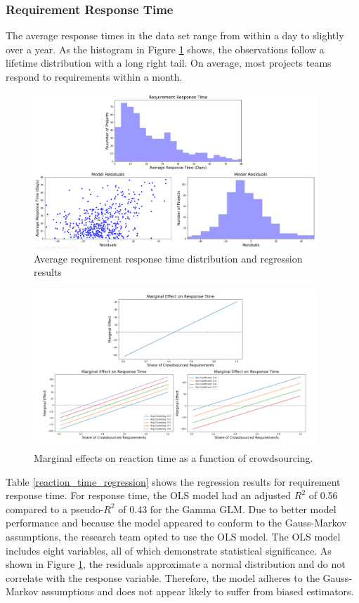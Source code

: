 \subsubsection{Requirement Response Time}

The average response times in the data set range from within a day to slightly over a year. As the histogram in Figure \ref{reaction_time_results} shows, the observations follow a lifetime distribution with a long right tail. On average, most projects teams respond to requirements within a month.

\begin{figure}
  \includegraphics[width=0.95\textwidth]{reaction_time_results.PNG}
\caption{Average requirement response time distribution and regression results}
\label{reaction_time_results}
\end{figure}

\begin{figure}
  \includegraphics[width=0.95\textwidth]{reaction_time_marginal.PNG}
\caption{Marginal effects on reaction time as a function of crowdsourcing.}
\label{reaction_time_marginal}
\end{figure}

Table \ref{reaction_time_regression} shows the regression results for requirement response time. For response time, the OLS model had an adjusted $R^2$ of 0.56 compared to a pseudo-$R^2$ of 0.43 for the Gamma GLM. Due to better model performance and because the model appeared to conform to the Gauss-Markov assumptions, the research team opted to use the OLS model. The OLS model includes eight variables, all of which demonstrate statistical significance. As shown in Figure \ref{reaction_time_results}, the residuals approximate a normal distribution and do not correlate with the response variable. Therefore, the model adheres to the Gauss-Markov assumptions \cite{wooldridge} and does not appear likely to suffer from biased estimators.

